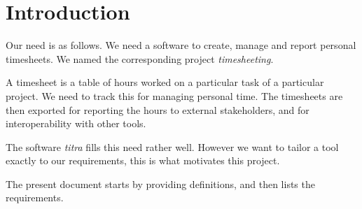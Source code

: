 \section{Introduction}
Our need is as follows. We need a software to create, manage and report
personal timesheets. We named the corresponding project \emph{timesheeting}.

A timesheet is a table of hours worked on a particular task of a particular
project. We need to track this for managing personal time. The timesheets
are then exported for reporting the hours to external stakeholders, and
for interoperability with other tools.

The software \emph{titra} \cite{titra} fills this need rather well. However
we want to tailor a tool exactly to our requirements, this is what motivates
this project.

The present document starts by providing definitions, and then lists
the requirements.